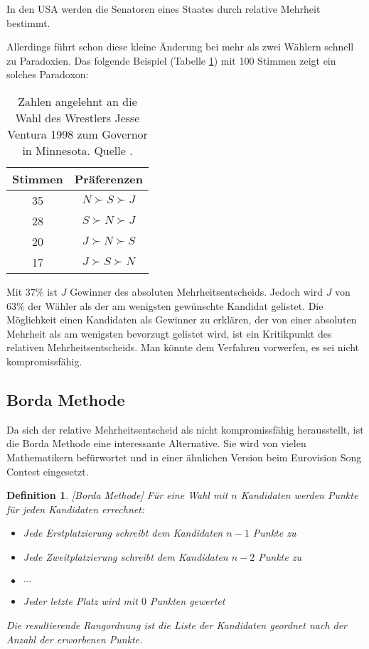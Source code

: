 \documentclass[BCOR5mm,DIV12,a4paper,10pt]{scrartcl}
\newtheorem{definition}[lemma]{Definition} %
\begin{document}
In den USA werden die Senatoren eines Staates durch relative Mehrheit bestimmt. %

Allerdings führt schon diese kleine Änderung bei mehr als zwei Wählern schnell zu Paradoxien. Das folgende Beispiel (Tabelle \ref{tab:wrestlerwahl}) mit 100 Stimmen zeigt ein solches Paradoxon:

\begin{table}[h]
\centering
\begin{tabular}{c|c}
Stimmen & Präferenzen \\
\hline
35 & $ N \succ S \succ J $\\ 
28 & $ S \succ N \succ J $ \\
20 & $ J \succ N \succ S $ \\
17 & $ J \succ S \succ N $ \\
\end{tabular}
	\caption{Zahlen angelehnt an die Wahl des Wrestlers Jesse Ventura 1998 zum Governor in Minnesota. Quelle \cite[Table 3.1]{hodge2005mathematics}.}
	\label{tab:wrestlerwahl}
\end{table}

Mit $37\%$ ist $J$ Gewinner des absoluten Mehrheitsentscheids. Jedoch wird $J$ von $63\%$ der Wähler als der am wenigsten gewünschte Kandidat gelistet. Die Möglichkeit einen Kandidaten als Gewinner zu erklären, der von einer absoluten Mehrheit als am wenigsten bevorzugt gelistet wird, ist ein Kritikpunkt des relativen Mehrheitsentscheids. Man könnte dem Verfahren vorwerfen, es sei nicht kompromissfähig.

\subsection{Borda Methode}
Da sich der relative Mehrheitsentscheid als nicht kompromissfähig herausstellt, ist die Borda Methode eine interessante Alternative. Sie wird von vielen Mathematikern befürwortet \cite{hodge2005mathematics} und in einer ähnlichen Version beim Eurovision Song Contest eingesetzt.

\begin{definition}\emph{[Borda Methode]}
Für eine Wahl mit $n$ Kandidaten werden Punkte für jeden Kandidaten errechnet:
\begin{itemize}
\item Jede Erstplatzierung schreibt dem Kandidaten $n-1$ Punkte zu
\item Jede Zweitplatzierung schreibt dem Kandidaten $n-2$ Punkte zu
\item $\cdots$
\item Jeder letzte Platz wird mit $0$ Punkten gewertet
\end{itemize}
Die resultierende Rangordnung ist die Liste der Kandidaten geordnet nach der Anzahl der erworbenen Punkte.
\end{definition}
\end{document}
